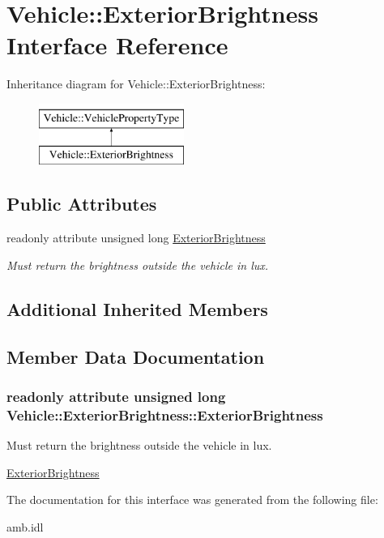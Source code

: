 \hypertarget{interfaceVehicle_1_1ExteriorBrightness}{\section{Vehicle\-:\-:Exterior\-Brightness Interface Reference}
\label{interfaceVehicle_1_1ExteriorBrightness}
}
Inheritance diagram for Vehicle\-:\-:Exterior\-Brightness\-:\begin{figure}[H]
\begin{center}
\leavevmode
\includegraphics[height=2.000000cm]{interfaceVehicle_1_1ExteriorBrightness}
\end{center}
\end{figure}
\subsection*{Public Attributes}
\begin{DoxyCompactItemize}
\item 
readonly attribute unsigned long \hyperlink{interfaceVehicle_1_1ExteriorBrightness_aea8a8c9d3f279d6b50acde3e0f17fbca}{Exterior\-Brightness}
\begin{DoxyCompactList}\small\item\em Must return the brightness outside the vehicle in lux. \end{DoxyCompactList}\end{DoxyCompactItemize}
\subsection*{Additional Inherited Members}


\subsection{Member Data Documentation}
\hypertarget{interfaceVehicle_1_1ExteriorBrightness_aea8a8c9d3f279d6b50acde3e0f17fbca}{
\subsubsection[{Exterior\-Brightness}]{\setlength{\rightskip}{0pt plus 5cm}readonly attribute unsigned long Vehicle\-::\-Exterior\-Brightness\-::\-Exterior\-Brightness}}\label{interfaceVehicle_1_1ExteriorBrightness_aea8a8c9d3f279d6b50acde3e0f17fbca}


Must return the brightness outside the vehicle in lux. 

\hyperlink{interfaceVehicle_1_1ExteriorBrightness}{Exterior\-Brightness} 

The documentation for this interface was generated from the following file\-:\begin{DoxyCompactItemize}
\item 
amb.\-idl\end{DoxyCompactItemize}
